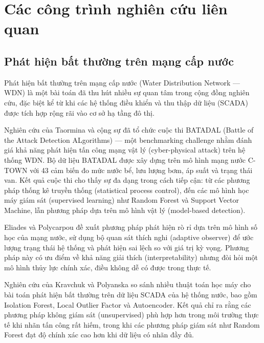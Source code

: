 \section{Các công trình nghiên cứu liên quan}

\subsection{Phát hiện bất thường trên mạng cấp nước}

Phát hiện bất thường trên mạng cấp nước (Water Distribution Network --- WDN) là
một bài toán đã thu hút nhiều sự quan tâm trong cộng đồng nghiên cứu, đặc biệt kể
từ khi các hệ thống điều khiển và thu thập dữ liệu (SCADA) được tích hợp rộng rãi
vào cơ sở hạ tầng đô thị.

Nghiên cứu của Taormina và cộng sự \cite{taormina2018batadal} đã tổ chức cuộc thi
BATADAL (Battle of the Attack Detection ALgorithms) --- một benchmarking challenge
nhằm đánh giá khả năng phát hiện tấn công mạng vật lý (cyber-physical attack) trên
hệ thống WDN. Bộ dữ liệu BATADAL được xây dựng trên mô hình mạng nước C-TOWN với
43 cảm biến đo mức nước bể, lưu lượng bơm, áp suất và trạng thái van. Kết quả
cuộc thi cho thấy sự đa dạng trong cách tiếp cận: từ các phương pháp thống kê
truyền thống (statistical process control), đến các mô hình học máy giám sát
(supervised learning) như Random Forest và Support Vector Machine, lẫn phương pháp
dựa trên mô hình vật lý (model-based detection).

Eliades và Polycarpou \cite{eliades2012leakage} đề xuất phương pháp phát hiện rò
rỉ dựa trên mô hình số học của mạng nước, sử dụng bộ quan sát thích nghi
(adaptive observer) để ước lượng trạng thái hệ thống và phát hiện sai lệch so với
giá trị kỳ vọng. Phương pháp này có ưu điểm về khả năng giải thích (interpretability)
nhưng đòi hỏi một mô hình thủy lực chính xác, điều không dễ có được trong thực tế.

Nghiên cứu của Kravchuk và Polyanska \cite{kravchuk2019anomaly} so sánh nhiều thuật
toán học máy cho bài toán phát hiện bất thường trên dữ liệu SCADA của hệ thống
nước, bao gồm Isolation Forest, Local Outlier Factor và Autoencoder. Kết quả chỉ ra
rằng các phương pháp không giám sát (unsupervised) phù hợp hơn trong môi trường
thực tế khi nhãn tấn công rất hiếm, trong khi các phương pháp giám sát như Random
Forest đạt độ chính xác cao hơn khi dữ liệu có nhãn đầy đủ.

